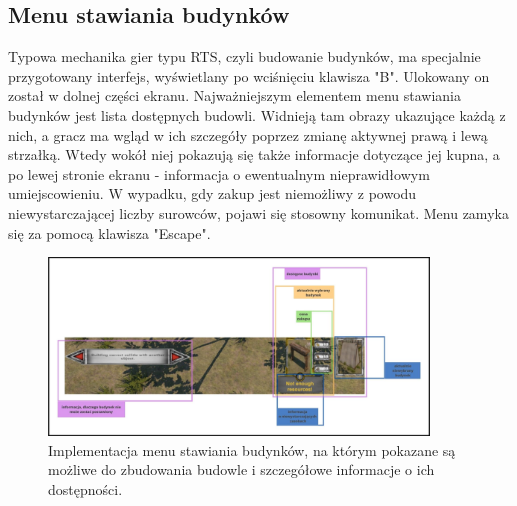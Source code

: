 \subsection{Menu stawiania budynków}
Typowa mechanika gier typu RTS, czyli budowanie budynków, ma specjalnie przygotowany interfejs, wyświetlany po wciśnięciu klawisza "B". 
Ulokowany on został w dolnej części ekranu. Najważniejszym elementem menu stawiania budynków jest lista dostępnych budowli. Widnieją tam 
obrazy ukazujące każdą z nich, a gracz ma wgląd w ich szczegóły poprzez zmianę aktywnej prawą i lewą strzałką. Wtedy wokół niej pokazują się także informacje dotyczące jej kupna,
a po lewej stronie ekranu - informacja o ewentualnym nieprawidłowym umiejscowieniu. W wypadku, gdy zakup jest niemożliwy z powodu niewystarczającej liczby 
surowców, pojawi się stosowny komunikat. Menu zamyka się za pomocą klawisza "Escape".
\begin{figure}[htbp]
    \centering
    \includegraphics[width=0.9\textwidth]{images/ui/opis_ekementow_budowanie.png}
    \caption{Implementacja menu stawiania budynków, na którym pokazane są możliwe do zbudowania budowle 
    i szczegółowe informacje o ich dostępności.
    }\label{fig:compass}
\end{figure}
\FloatBarrier

